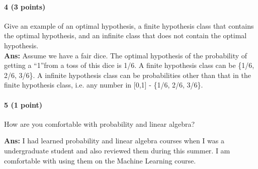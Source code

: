 \documentclass[11pt]{article}
\begin{document}
\paragraph{4 (3 points)} 
Give an example of an optimal hypothesis, a finite hypothesis class that contains the optimal hypothesis, and an infinite class that does not contain the optimal hypothesis.\\
\noindent
\textbf{Ans:} Assume we have a fair dice. The optimal hypothesis of the probability of getting a \textquotedblleft1\textquotedblright from a toss of this dice is 1/6. A finite hypothesis class can be \{1/6, 2/6, 3/6\}. A infinite hypothesis class can be probabilities other than that in the finite hypothesis class, i.e. any number in [0,1] - \{1/6, 2/6, 3/6\}.

\paragraph{5 (1 point)}
How are you comfortable with probability and linear algebra?

\noindent
\textbf{Ans:}
I had learned probability and linear algebra courses when I was a undergraduate student and also reviewed them during this summer. I am comfortable with using them on the Machine Learning course.
\end{document}

